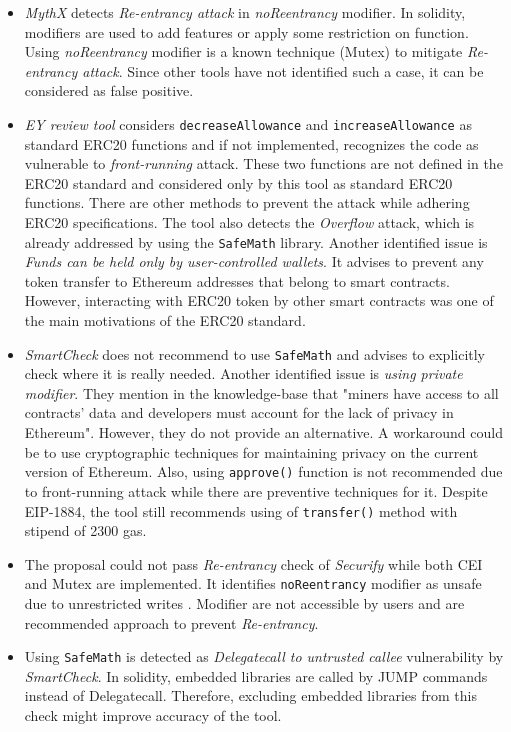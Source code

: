 \begin{itemize}
	\item \textit{MythX} detects \textit{Re-entrancy attack} in \textit{noReentrancy} modifier. In solidity, modifiers are used to add features or apply some restriction on function\cite{SolidityModifer}. Using \textit{noReentrancy} modifier is a known technique (Mutex) to mitigate \textit{Re-entrancy attack}\cite{ReentrancyGuard}. Since other tools have not identified such a case, it can be considered as false positive.
	\item \textit{EY review tool} considers \texttt{decreaseAllowance} and \texttt{increaseAllowance} as standard ERC20 functions and if not implemented, recognizes the code as vulnerable to \textit{front-running} attack. These two functions are not defined in the ERC20 standard\cite{ERC20Std} and considered only by this tool as standard ERC20 functions. There are other methods to prevent the attack while adhering ERC20 specifications\cite{ERC20MWA}. The tool also detects the \textit{Overflow} attack, which is already addressed by using the \texttt{SafeMath} library. Another identified issue is \textit{Funds can be held only by user-controlled wallets}. It advises to prevent any token transfer to Ethereum addresses that belong to smart contracts. However, interacting with ERC20 token by other smart contracts was one of the main motivations of the ERC20 standard.
	\item \textit{SmartCheck} does not recommend to use \texttt{SafeMath} and advises to explicitly check where it is really needed. Another identified issue is \textit{using private modifier}. They mention in the knowledge-base that "miners have access to all contracts’ data and developers must account for the lack of privacy in Ethereum". However, they do not provide an alternative. A workaround could be to use cryptographic techniques for maintaining privacy on the current version of Ethereum. Also, using \texttt{approve()} function is not recommended due to front-running attack while there are preventive techniques for it. Despite EIP-1884, the tool still recommends using of \texttt{transfer()} method with stipend of 2300 gas.
	\item The proposal could not pass \textit{Re-entrancy} check of \textit{Securify} while both CEI and Mutex are implemented. It identifies \texttt{noReentrancy} modifier as unsafe due to unrestricted writes \cite{SECURIFY}. Modifier are not accessible by users and are recommended approach to prevent \textit{Re-entrancy}.
	\item Using \texttt{SafeMath} is detected as \textit{Delegatecall to untrusted callee} vulnerability by \textit{SmartCheck}. In solidity, embedded libraries are called by JUMP commands instead of Delegatecall. Therefore, excluding embedded libraries from this check might improve accuracy of the tool.
\end{itemize}
